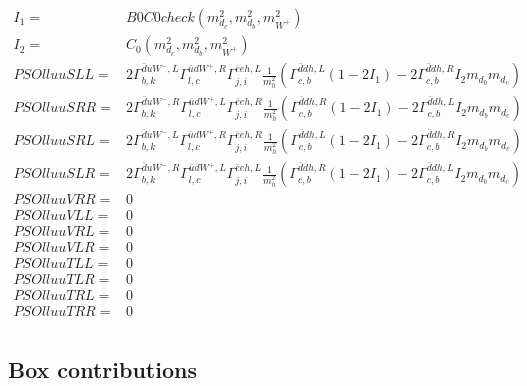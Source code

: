\documentclass[A4,landscape]{article}
\begin{document}
\begin{align} 
I_1= & B0C0check(m^2_{d_{{c}}}, m^2_{d_{{b}}}, m^2_{W^+}) \\ 
I_2= & C_0(m^2_{d_{{c}}}, m^2_{d_{{b}}}, m^2_{W^+}) \\ 
  PSOlluuSLL= & 2  \Gamma^{\bar{d}u W^-,L}_{b, k} \Gamma^{\bar{u}d W^+ ,R}_{l, c} \Gamma^{\bar{e}e h ,L}_{j, i} \frac{1}{m^2_{h}} (\Gamma^{\bar{d}d h ,L}_{c, b} (1 - 2 I_1) - 2 \Gamma^{\bar{d}d h ,R}_{c, b} I_2 m_{d_{{b}}} m_{d_{{c}}}) \\ 
  PSOlluuSRR= & 2  \Gamma^{\bar{d}u W^-,R}_{b, k} \Gamma^{\bar{u}d W^+ ,L}_{l, c} \Gamma^{\bar{e}e h ,R}_{j, i} \frac{1}{m^2_{h}} (\Gamma^{\bar{d}d h ,R}_{c, b} (1 - 2 I_1) - 2 \Gamma^{\bar{d}d h ,L}_{c, b} I_2 m_{d_{{b}}} m_{d_{{c}}}) \\ 
  PSOlluuSRL= & 2  \Gamma^{\bar{d}u W^-,L}_{b, k} \Gamma^{\bar{u}d W^+ ,R}_{l, c} \Gamma^{\bar{e}e h ,R}_{j, i} \frac{1}{m^2_{h}} (\Gamma^{\bar{d}d h ,L}_{c, b} (1 - 2 I_1) - 2 \Gamma^{\bar{d}d h ,R}_{c, b} I_2 m_{d_{{b}}} m_{d_{{c}}}) \\ 
  PSOlluuSLR= & 2  \Gamma^{\bar{d}u W^-,R}_{b, k} \Gamma^{\bar{u}d W^+ ,L}_{l, c} \Gamma^{\bar{e}e h ,L}_{j, i} \frac{1}{m^2_{h}} (\Gamma^{\bar{d}d h ,R}_{c, b} (1 - 2 I_1) - 2 \Gamma^{\bar{d}d h ,L}_{c, b} I_2 m_{d_{{b}}} m_{d_{{c}}}) \\ 
  PSOlluuVRR= & 0 \\ 
  PSOlluuVLL= & 0 \\ 
  PSOlluuVRL= & 0 \\ 
  PSOlluuVLR= & 0 \\ 
  PSOlluuTLL= & 0 \\ 
  PSOlluuTLR= & 0 \\ 
  PSOlluuTRL= & 0 \\ 
  PSOlluuTRR= & 0 \\ 
\end{align} 
\subsection{Box contributions} 
\end{document}
